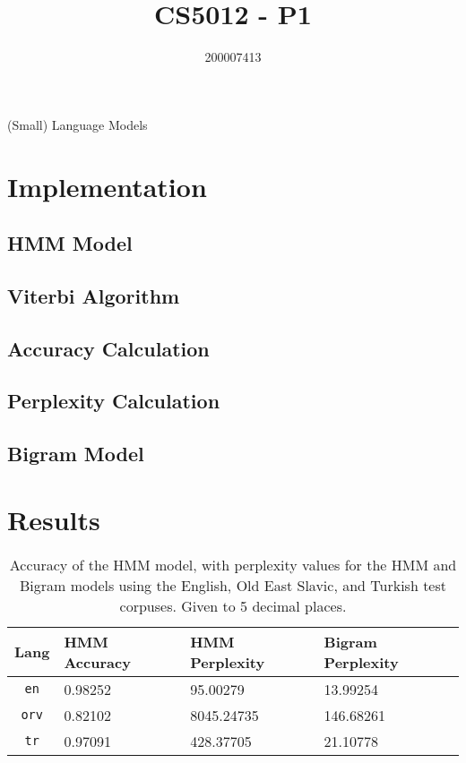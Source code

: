 \documentclass[a4paper, 12pt]{article}
\title{CS5012 - P1}
\author{200007413}
\date{}
\begin{document}
\begin{titlepage}
    \centering
    \vspace*{\fill}
    {\Huge\thetitle}

    {\LARGE(Small) Language Models}
    
    {\large\theauthor}
    \vspace*{\fill}
\end{titlepage}

\pagebreak

\section{Implementation}

\subsection{HMM Model}

\subsection{Viterbi Algorithm}

\subsection{Accuracy Calculation}

\subsection{Perplexity Calculation}

\subsection{Bigram Model}

\pagebreak
\section{Results}

\begin{table}[H]
    \centering
    \begin{tabular}{c | l | l | l}
        \textbf{Lang}   & \textbf{HMM Accuracy} & \textbf{HMM Perplexity}   & \textbf{Bigram Perplexity}\\
        \hline
        \texttt{en}     & 0.98252               & 95.00279                  & 13.99254                  \\
        \hline
        \texttt{orv}    & 0.82102               & 8045.24735                & 146.68261                 \\
        \hline
        \texttt{tr}     & 0.97091               & 428.37705                 & 21.10778                  \\
    \end{tabular}
    \caption{Accuracy of the HMM model, with perplexity values for the HMM and Bigram models using the English, Old East Slavic, and Turkish test corpuses. Given to 5 decimal places.}
    \label{tab:hmm-accuracy}
\end{table}
\end{document}
